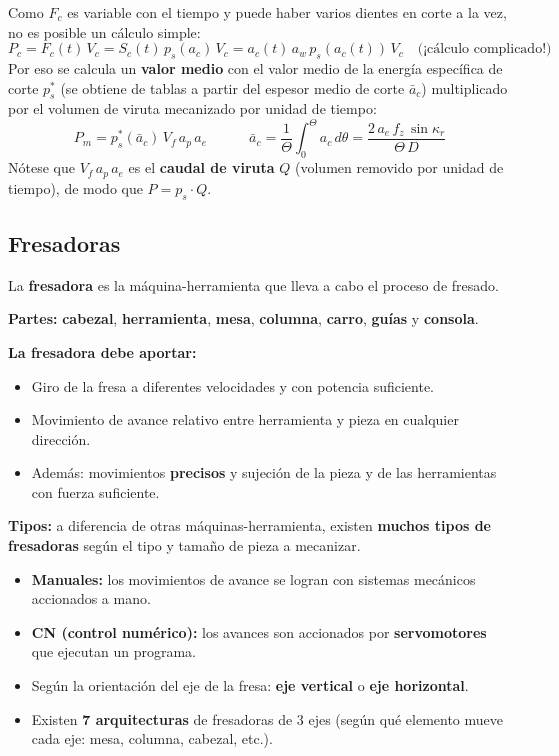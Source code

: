 \documentclass[12pt,a4paper]{article}
\begin{document}
\begin{formu}
	Como $F_c$ es variable con el tiempo y puede haber varios dientes en corte a
	la vez, no es posible un cálculo simple:
	\[ P_c = F_c(t)\, V_c = S_c(t)\, p_s(a_c)\, V_c = a_c(t)\, a_w\, p_s(a_c(t))\,
		V_c \quad \text{(¡cálculo complicado!)} \]
	Por eso se calcula un \textbf{valor medio} con el valor medio de la energía
	específica de corte $p_s^*$ (se obtiene de tablas a partir del espesor medio
	de
	corte $\bar a_c$) multiplicado por el volumen de viruta mecanizado por unidad
	de
	tiempo:
	\[ P_m = p_s^*(\bar a_c)\, V_f\, a_p\, a_e \qquad\quad \bar a_c =
		\frac{1}{\Theta}\int_0^{\Theta} a_c\, d\theta = \frac{2\, a_e\, f_z\,
			\sin\kappa_r}{\Theta\, D} \]
	Nótese que $V_f\, a_p\, a_e$ es el \textbf{caudal de viruta} $Q$ (volumen
	removido por unidad de tiempo), de modo que $P = p_s\cdot Q$.
\end{formu}

\subsection{Fresadoras}
La \textbf{fresadora} es la máquina-herramienta que lleva a cabo el proceso de
fresado.

\textbf{Partes:} \textbf{cabezal}, \textbf{herramienta}, \textbf{mesa},
\textbf{columna}, \textbf{carro}, \textbf{guías} y \textbf{consola}.

\textbf{La fresadora debe aportar:}
\begin{itemize}
	\item Giro de la fresa a diferentes velocidades y con potencia suficiente.
	\item Movimiento de avance relativo entre herramienta y pieza en cualquier
	      dirección.
	\item Además: movimientos \textbf{precisos} y sujeción de la pieza y de las
	      herramientas con fuerza suficiente.
\end{itemize}

\textbf{Tipos:} a diferencia de otras máquinas-herramienta, existen
\textbf{muchos tipos de fresadoras} según el tipo y tamaño de pieza a mecanizar.
\begin{itemize}
	\item \textbf{Manuales:} los movimientos de avance se logran con sistemas
	      mecánicos accionados a mano.
	\item \textbf{CN (control numérico):} los avances son accionados por
	      \textbf{servomotores} que ejecutan un programa.
	\item Según la orientación del eje de la fresa: \textbf{eje vertical} o
	      \textbf{eje horizontal}.
	\item Existen \textbf{7 arquitecturas} de fresadoras de 3 ejes (según qué
	      elemento mueve cada eje: mesa, columna, cabezal, etc.).
\end{itemize}
\end{document}
